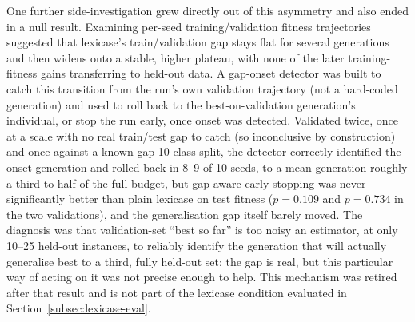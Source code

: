 
One further side-investigation grew directly out of this asymmetry and
also ended in a null result. Examining per-seed
training/validation fitness trajectories suggested that lexicase's
train/validation gap stays flat for several generations and then widens
onto a stable, higher plateau, with none of the later training-fitness
gains transferring to held-out data. A gap-onset detector was built to
catch this transition from the run's own validation trajectory (not a
hard-coded generation) and used to roll back to the best-on-validation
generation's individual, or stop the run early, once onset was detected.
Validated twice, once at a scale with no real train/test gap to catch (so
inconclusive by construction) and once against a known-gap 10-class split,
the detector correctly identified the onset generation and rolled back in
8--9 of 10 seeds, to a mean generation roughly a third to half of the full
budget, but gap-aware early stopping was never significantly better than
plain lexicase on test fitness ($p=0.109$ and $p=0.734$ in the two
validations), and the generalisation gap itself barely moved. The diagnosis was that
validation-set ``best so far'' is too noisy an estimator, at only 10--25
held-out instances, to reliably identify the generation that will actually
generalise best to a third, fully held-out set: the gap is real, but this
particular way of acting on it was not precise enough to help. This
mechanism was retired after that result and is not part of the
lexicase condition evaluated in Section~\ref{subsec:lexicase-eval}.


